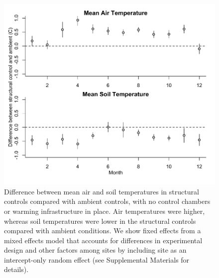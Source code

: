\documentclass{article}
\begin{document}
 \begin{figure}[h]
     \centering
 \includegraphics{../figures/ShamVSAmbient_mean.pdf}    
 \caption{Difference between mean air and soil temperatures in structural controls compared with ambient controls, with no control chambers or warming infrastructure in place. Air temperatures were higher, whereas soil temperatures were lower in the structural controls compared with ambient conditions. We show fixed effects from a mixed effects model that accounts for differences in experimental design and other factors among sites by including site as an intercept-only random effect (see Supplemental Materials for details).} %
 \end{figure}
 \clearpage
\end{document}
